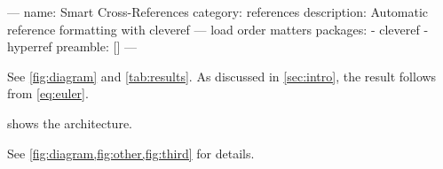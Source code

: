 ---
name: Smart Cross-References
category: references
description: Automatic reference formatting with cleveref — load order matters
packages:
  - cleveref
  - hyperref
preamble: []
---


See \cref{fig:diagram} and \cref{tab:results}.
As discussed in \cref{sec:intro}, the result follows from \cref{eq:euler}.

 shows the architecture.

See \cref{fig:diagram,fig:other,fig:third} for details.
